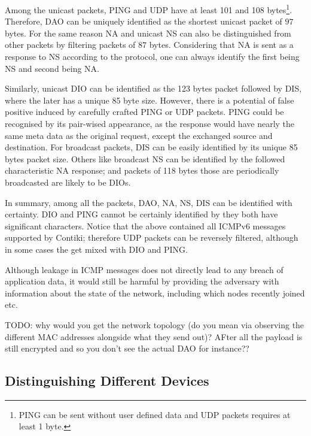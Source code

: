 \documentclass{article}
\begin{document}

Among the unicast packets, PING and UDP have at least 101 and 108 bytes\footnote{PING can be sent without user defined data and UDP packets requires at least 1 byte.}. Therefore, DAO can be uniquely identified as the shortest unicast packet of $97$ bytes.  For the same reason NA and unicast NS can also be distinguished from other packets by filtering packets of $87$ bytes. Considering that NA is sent as a response to NS according to the protocol, one can always identify the first being NS and second being NA. 

Similarly, unicast DIO can be identified as the 123 bytes packet followed by DIS, where the later has a unique 85 byte size. However, there is a potential of false positive induced by carefully crafted PING or UDP packets. PING could be recognised by its pair-wised appearance, as the response would have nearly the same meta data as the original request, except the exchanged source and destination. For broadcast packets, DIS can be easily identified by its unique 85 bytes packet size. Others like broadcast NS can be identified by the followed characteristic NA response; and packets of 118 bytes those are periodically broadcasted are likely to be DIOs.

In summary, among all the packets, DAO, NA, NS, DIS can be identified with certainty. DIO and PING cannot be certainly identified by they both have significant characters. Notice that the above contained all ICMPv6 messages supported by Contiki; therefore UDP packets can be reversely filtered, although in some cases the get mixed with DIO and PING.

Although leakage in ICMP messages does not directly lead to any breach of application data, it would still be harmful by providing the adversary with information about the state of the network, including which nodes recently joined etc. 

TODO: why would you get the network topology (do you mean via observing the different MAC addresses alongside what they send out)? AFter all the payload is still encrypted and so you don't see the actual DAO for instance??

\subsection{Distinguishing Different Devices}
\end{document}
